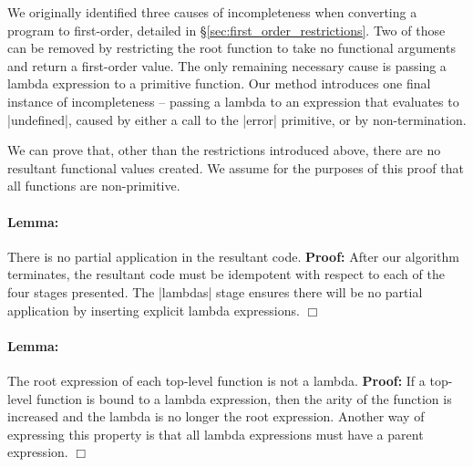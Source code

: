 \documentclass[preprint]{sigplanconf}
\begin{document}
We originally identified three causes of incompleteness when converting a program to first-order, detailed in \S\ref{sec:first_order_restrictions}. Two of those can be removed by restricting the root function to take no functional arguments and return a first-order value. The only remaining necessary cause is passing a lambda expression to a primitive function. Our method introduces one final instance of incompleteness -- passing a lambda to an expression that evaluates to |undefined|, caused by either a call to the |error| primitive, or by non-termination.

We can prove that, other than the restrictions introduced above, there are no resultant functional values created. We assume for the purposes of this proof that all functions are non-primitive.

\newenvironment{lemma}[1]
    {\paragraph{Lemma:} #1 \textbf{Proof:} }
    {\hfill$\Box$}

\begin{lemma}{There is no partial application in the resultant code.}
After our algorithm terminates, the resultant code must be idempotent with respect to each of the four stages presented. The |lambdas| stage ensures there will be no partial application by inserting explicit lambda expressions.
\end{lemma}

\begin{lemma}{The root expression of each top-level function is not a lambda.}
If a top-level function is bound to a lambda expression, then the arity of the function is increased and the lambda is no longer the root expression. Another way of expressing this property is that all lambda expressions must have a parent expression.
\end{lemma}
\end{document}
